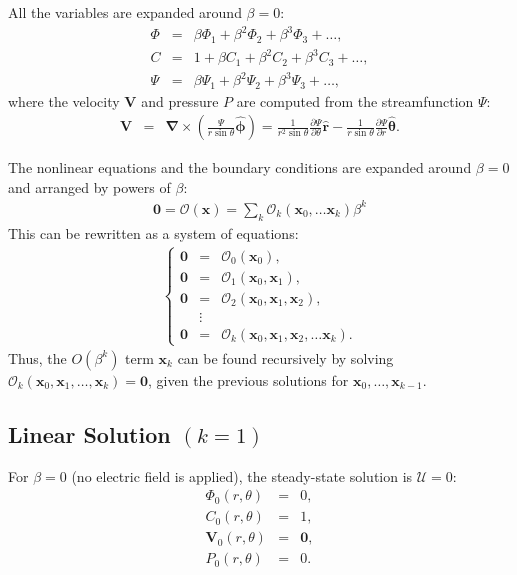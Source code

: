 \documentclass[final]{elsarticle}
\newcommand{\deriv}[2]{\frac{\partial #1}{\partial #2}}
\newcommand{\brc}[2]{\left\{\begin{array}{#1}#2\end{array}\right.}
\newcommand{\pars}[1]{\left(#1\right)}
\newcommand\bnabla{\boldsymbol{\nabla}}
\newcommand\bV{\boldsymbol{V}}
\newcommand\bx{\boldsymbol{x}}
\newcommand\br{\boldsymbol{r}}
\newcommand\brhat{\hat{\br}}
\newcommand\btheta{\boldsymbol{\theta}}
\newcommand\bthetahat{\hat{\btheta}}
\newcommand\bphi{\boldsymbol{\phi}}
\newcommand\bphihat{\hat{\bphi}}
\newcommand\bzero{\boldsymbol{0}}
\newcommand\cO{\mathcal{O}}
\newcommand\cU{\mathscr{U}}
\begin{document}
\begin{appendix}
All the variables are expanded around $\beta = 0$:
\begin{eqnarray*}
\varPhi &=& \beta \varPhi_1 + \beta^2 \varPhi_2 + \beta^3 \varPhi_3 + \ldots, \\
C &=& 1 + \beta C_1 + \beta^2 C_2 + \beta^3 C_3 + \ldots, \\
\Psi &=& \beta \Psi_1 + \beta^2 \Psi_2 + \beta^3 \Psi_3 + \ldots ,
\end{eqnarray*}
where the velocity $\bV$ and pressure $P$ are computed from the streamfunction $\Psi$:
\begin{eqnarray*}
\bV &=& \bnabla \times \pars{\frac{\Psi}{r \sin\theta} \bphihat} 
= \frac{1}{r^2 \sin\theta} \deriv{\Psi}{\theta} \brhat 
- \frac{1}{r \sin\theta} \deriv{\Psi}{r} \bthetahat.
\end{eqnarray*}

The nonlinear equations and the boundary conditions are expanded around $\beta = 0$
and arranged by powers of $\beta$:
\begin{eqnarray*}
\bzero = \cO(\bx) = \sum_k \cO_k(\bx_0, \ldots \bx_k) \beta^k
\end{eqnarray*}
This can be rewritten as a system of equations:
\begin{eqnarray*}
\brc{rcl}{
\bzero &=& \cO_0(\bx_0), \\
\bzero &=& \cO_1(\bx_0, \bx_1), \\
\bzero &=& \cO_2(\bx_0, \bx_1, \bx_2), \\
& \vdots & \\
\bzero &=& \cO_k(\bx_0, \bx_1, \bx_2, \ldots \bx_k).
}
\end{eqnarray*}
Thus, the $O(\beta^k)$ term $\bx_k$ can be found recursively by solving 
$\cO_k(\bx_0, \bx_1, \ldots, \bx_k) = \bzero$,
given the previous solutions for $\bx_0, \ldots, \bx_{k-1}$.

\subsection{Linear Solution $(k=1)$}

For $\beta = 0$ (no electric field is applied), the steady-state solution is $\cU = 0$:
\begin{eqnarray*}
\varPhi_0(r,\theta) &=& 0, \\
C_0(r,\theta) &=& 1, \\
\bV_0(r,\theta) &=& \bzero, \\
P_0(r,\theta) &=& 0.
\end{eqnarray*}


\end{appendix}
\end{document}
